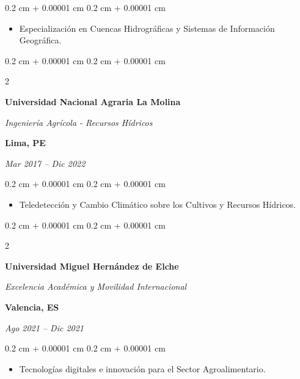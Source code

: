 \documentclass[10pt, letterpaper]{article}
\newenvironment{highlights}{
    \begin{itemize}[
        topsep=0.10 cm,
        parsep=0.10 cm,
        partopsep=0pt,
        itemsep=0pt,
        leftmargin=0.4 cm + 10pt
    ]
}{
    \end{itemize}
} %
\newenvironment{onecolentry}{
    \begin{adjustwidth}{
        0.2 cm + 0.00001 cm
    }{
        0.2 cm + 0.00001 cm
    }
}{
    \end{adjustwidth}
} %
\newenvironment{twocolentry}[2][]{
    \onecolentry
    \def\secondColumn{#2}
    \setcolumnwidth{\fill, 4.5 cm}
    \begin{paracol}{2}
}{
    \switchcolumn \raggedleft \secondColumn
    \end{paracol}
    \endonecolentry
} %
\begin{document}
        \vspace{0.10 cm}
        \begin{onecolentry}
            \begin{highlights}
                \item Especialización en Cuencas Hidrográficas y Sistemas de Información Geográfica.
            \end{highlights}
        \end{onecolentry}
        
        \vspace{0.2 cm}
            
        \begin{twocolentry}{
        \textbf{Lima, PE} 
            
        \textit{Mar 2017 – Dic 2022}}
            \textbf{Universidad Nacional Agraria La Molina}

            \textit{Ingeniería Agrícola - Recursos Hídricos}
        \end{twocolentry}

        \vspace{0.10 cm}
        \begin{onecolentry}
            \begin{highlights}
                \item Teledetección y Cambio Climático sobre los Cultivos y Recursos Hídricos. 
            \end{highlights}
        \end{onecolentry}

        \vspace{0.2 cm}

        \begin{twocolentry}{
        \textbf{Valencia, ES}    
            
        \textit{Ago 2021 – Dic 2021}}
            \textbf{Universidad Miguel Hernández de Elche}

            \textit{Excelencia Académica y Movilidad Internacional}
        \end{twocolentry}

        \vspace{0.10 cm}
        \begin{onecolentry}
            \begin{highlights}
                \item Tecnologías digitales e innovación para el Sector Agroalimentario.
            \end{highlights}
        \end{onecolentry}
        
\end{document}
